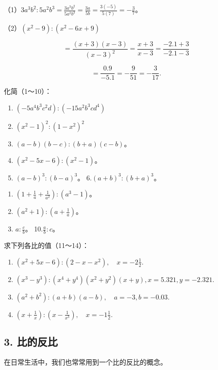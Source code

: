 （1）\(3a^{3}b^{2}:5a^{2}b^{3} = \frac{3a^{3}b^{2}}{5a^{2}b^{3}} = \frac{3a}{5b} = \frac{3(-5)}{5(7)} = -\frac{3}{7}\)。

（2）\((x^{2} - 9):(x^{2} - 6x + 9)\)

\[
= \frac{(x + 3) (x - 3)}{(x - 3) ^{2}} = \frac{x + 3}{x - 3} = \frac{- 2.1 + 3}{- 2.1 - 3}
\]

\[
= \frac{0.9}{- 5.1} = - \frac{9}{51} = - \frac{3}{17}.
\]

化简（1～10）：

\begin{enumerate}[start=1]
\item
  \((-5a^{4}b^{3}c^{2}d):(-15a^{2}b^{3}cd^{4})\)
\item
  \((x^{2} - 1)^{2}:(1 - x^{2})^{2}\)
\item
  \((a - b)(b - c):(b + a)(c - b)\)。
\item
  \((x^{2} - 5x - 6):(x^{2} - 1)\)。
\item
  \((a - b)^{3}:(b - a)^{3}\)。 6.\((a + b)^{3}:(b + a)^{3}\)。
\end{enumerate}

\begin{enumerate}[start=7]
\item
  \(\left(1 + \frac{1}{a} + \frac{1}{a^2}\right): (a^3 - 1)\)。
\item
  \((a^2 + 1): \left(a + \frac{1}{a}\right)\)。
\item
  \(a: \frac{c}{b}\)。 10.\(\frac{a}{b}: c\)。
\end{enumerate}

求下列各比的值（11～14）：

\begin{enumerate}[start=11]
\item
  \((x^{2} + 5x - 6):(2 - x - x^{2}),\quad x = -2\frac{1}{2}.\)
\item
  \((x^{3} - y^{3}):(x^{4} + y^{4})(x^{2} + y^{2})(x + y), x = 5.321, y = -2.321.\)
\item
  \((a^2 + b^2): (a + b)(a - b), \quad a = -3, b = -0.03.\)
\item
  \(\left(x + \frac{1}{x}\right):\left(x - \frac{1}{x^3}\right),\quad x = -1\frac{1}{2}.\)
\end{enumerate}

\subsection{3. 比的反比}

在日常生活中，我们也常常用到一个比的反比的概念。

